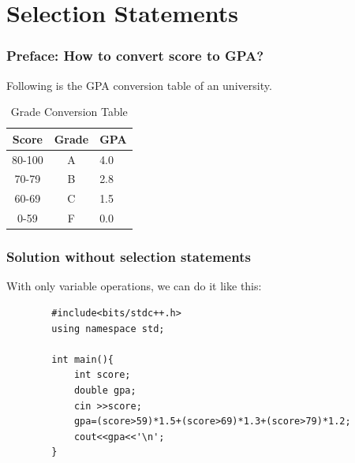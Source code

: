 \documentclass[xcolor=dvipsnames]{beamer}
\begin{document}
    \section{Selection Statements}
    \begin{frame}
        \frametitle{Preface: How to convert score to GPA?}
        Following is the GPA conversion table of an university.
        \begin{table}
            \centering
            \begin{tabular}{ccl}
                \toprule
                Score & Grade & GPA \\
                \midrule
                80-100 & A & 4.0 \\
                70-79 & B & 2.8 \\
                60-69 & C & 1.5 \\
                0-59 & F & 0.0 \\
                \bottomrule
            \end{tabular}
            \caption{Grade Conversion Table}
        \end{table}
    \end{frame}
    \begin{frame}[fragile]
        \frametitle{Solution without selection statements}
        With only variable operations, we can do it like this:
        \begin{verbatim}
        #include<bits/stdc++.h>
        using namespace std;

        int main(){
            int score;
            double gpa;
            cin >>score;
            gpa=(score>59)*1.5+(score>69)*1.3+(score>79)*1.2;
            cout<<gpa<<'\n';
        }            
        \end{verbatim}
        
    \end{frame}
\end{document}
